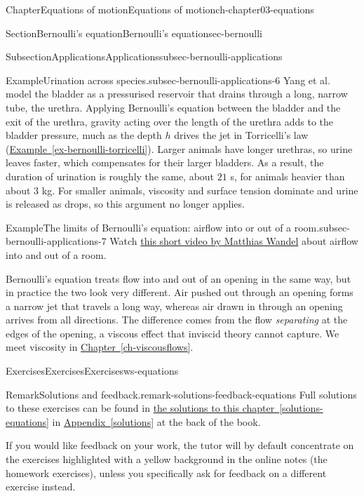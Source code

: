 \documentclass[oneside,10pt,]{book}
\newcommand{\xreffont}{\relax}
\numberwithin{equation}{section}
\begin{document}
\begin{chapterptx}{Chapter}{Equations of motion}{}{Equations of motion}{}{}{ch-chapter03-equations}
\begin{sectionptx}{Section}{Bernoulli's equation}{}{Bernoulli's equation}{}{}{sec-bernoulli}
\begin{subsectionptx}{Subsection}{Applications}{}{Applications}{}{}{subsec-bernoulli-applications}
\begin{example}{Example}{Urination across species.}{subsec-bernoulli-applications-6}
Yang et al. model the bladder as a pressurised reservoir that drains through a long, narrow tube, the urethra. Applying Bernoulli's equation between the bladder and the exit of the urethra, gravity acting over the length of the urethra adds to the bladder pressure, much as the depth \(h\) drives the jet in Torricelli's law (\hyperref[ex-bernoulli-torricelli]{Example~{\xreffont\ref{ex-bernoulli-torricelli}}}). Larger animals have longer urethras, so urine leaves faster, which compensates for their larger bladders. As a result, the duration of urination is roughly the same, about \(21\) s, for animals heavier than about \(3\) kg. For smaller animals, viscosity and surface tension dominate and urine is released as drops, so this argument no longer applies.%
\end{example}
\begin{example}{Example}{The limits of Bernoulli's equation: airflow into or out of a room.}{subsec-bernoulli-applications-7}%
Watch \href{https://www.youtube.com/watch?v=1L2ef1CP-yw}{this short video by Matthias Wandel} about airflow into and out of a room.%
\par
Bernoulli's equation treats flow into and out of an opening in the same way, but in practice the two look very different. Air pushed out through an opening forms a narrow jet that travels a long way, whereas air drawn in through an opening arrives from all directions. The difference comes from the flow \emph{separating} at the edges of the opening, a viscous effect that inviscid theory cannot capture. We meet viscosity in \hyperref[ch-viscousflows]{Chapter~{\xreffont\ref{ch-viscousflows}}}.%
\end{example}
\end{subsectionptx}
\end{sectionptx}
%
%
\typeout{************************************************}
\typeout{************************************************}
%
\begin{exercises-section}{Exercises}{Exercises}{}{Exercises}{}{}{ws-equations}
\begin{introduction}{}%
\begin{remark}{Remark}{Solutions and feedback.}{remark-solutions-feedback-equations}%
Full solutions to these exercises can be found in \hyperref[solutions-equations]{the solutions to this chapter~{\xreffont\ref{solutions-equations}}} in \hyperref[solutions]{Appendix~{\xreffont\ref{solutions}}} at the back of the book.%
\par
If you would like feedback on your work, the tutor will by default concentrate on the exercises highlighted with a yellow background in the online notes (the homework exercises), unless you specifically ask for feedback on a different exercise instead.%

\end{remark}
\end{introduction}
\end{exercises-section}
\end{chapterptx}
\end{document}
